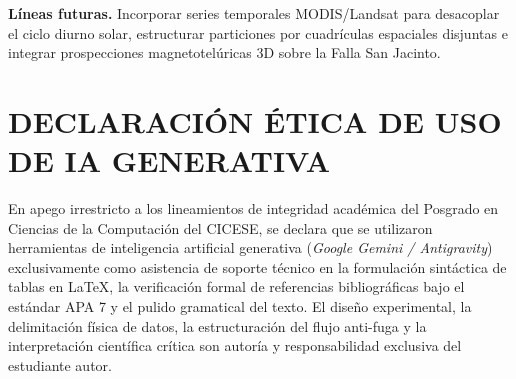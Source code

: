 \documentclass[10pt,twocolumn,letterpaper]{article}
\begin{document}
\textbf{Líneas futuras.} Incorporar series temporales MODIS/Landsat para desacoplar el ciclo diurno solar, estructurar particiones por cuadrículas espaciales disjuntas e integrar prospecciones magnetotelúricas 3D sobre la Falla San Jacinto.

\section*{DECLARACIÓN ÉTICA DE USO DE IA GENERATIVA}
En apego irrestricto a los lineamientos de integridad académica del Posgrado en Ciencias de la Computación del CICESE, se declara que se utilizaron herramientas de inteligencia artificial generativa (\emph{Google Gemini / Antigravity}) exclusivamente como asistencia de soporte técnico en la formulación sintáctica de tablas en LaTeX, la verificación formal de referencias bibliográficas bajo el estándar APA 7 y el pulido gramatical del texto. El diseño experimental, la delimitación física de datos, la estructuración del flujo anti-fuga y la interpretación científica crítica son autoría y responsabilidad exclusiva del estudiante autor.
\end{document}
